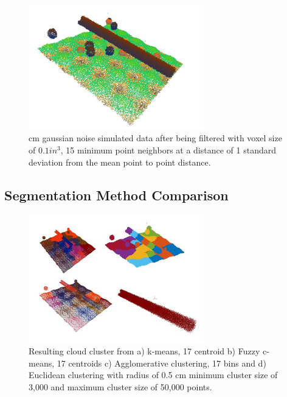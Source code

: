 \documentclass[12pt]{drexelthesis}
\let\Oldsubsection\subsection
\renewcommand{\subsection}{\FloatBarrier\Oldsubsection}
\begin{document}
\begin{figure}[!ht]
	
	\centering
		\includegraphics[width=3in]{simulated-lab-scan/2cmnoise/DS01k15std1.jpg}
		\caption[2 cm gaussian noise simulated data after being filtered with voxel size of 0.1 $in^{3}$, 15 minimum point neighbors at a distance of 1 standard deviation from the mean point to point distance]{ cm gaussian noise simulated data after being filtered with voxel size of $0.1 in^{3}$, 15 minimum point neighbors at a distance of 1 standard deviation from the mean point to point distance.}
\label{2cmnoise:filtered}
\end{figure}

\subsection{Segmentation Method Comparison}

\begin{figure}[!ht]
	
	\centering
		\includegraphics[width=3in]{simulated-lab-scan/2cmnoise/comparison.jpg}
		\caption[Comparison of unsupervised segmentation techniques on simulated dataset with induced noise.]{\centering Resulting cloud cluster from a) k-means, 17 centroid b) Fuzzy c-means, 17 centroids c) Agglomerative clustering, 17 bins and d) Euclidean clustering with radius of 0.5 cm minimum cluster size of 3,000 and maximum cluster size of 50,000 points.}
\label{2cmnoise:segcompare}
\end{figure}
\end{document}
